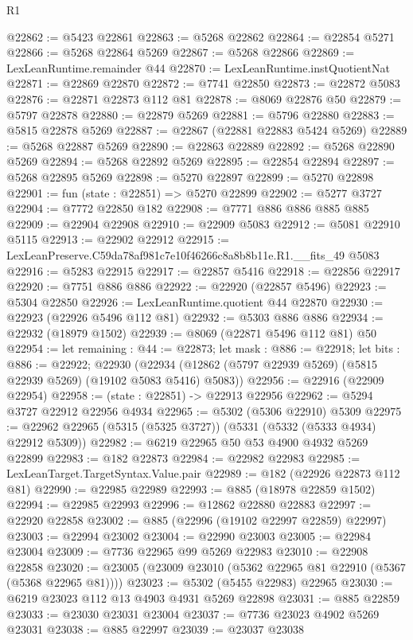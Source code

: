 \begin{lexlean}{R1}
\begin{coremodule}
@22862 := @5423 @22861
@22863 := @5268 @22862
@22864 := @22854 @5271
@22866 := @5268 @22864 @5269
@22867 := @5268 @22866
@22869 := LexLeanRuntime.remainder @44
@22870 := LexLeanRuntime.instQuotientNat
@22871 := @22869 @22870
@22872 := @7741 @22850
@22873 := @22872 @5083
@22876 := @22871 @22873 @112 @81
@22878 := @8069 @22876 @50
@22879 := @5797 @22878
@22880 := @22879 @5269
@22881 := @5796 @22880
@22883 := @5815 @22878 @5269
@22887 := @22867 (@22881 @22883 @5424 @5269)
@22889 := @5268 @22887 @5269
@22890 := @22863 @22889
@22892 := @5268 @22890 @5269
@22894 := @5268 @22892 @5269
@22895 := @22854 @22894
@22897 := @5268 @22895 @5269
@22898 := @5270 @22897
@22899 := @5270 @22898
@22901 := fun (state : @22851) => @5270 @22899
@22902 := @5277 @3727
@22904 := @7772 @22850 @182
@22908 := @7771 @886 @886 @885 @885
@22909 := @22904 @22908
@22910 := @22909 @5083
@22912 := @5081 @22910 @5115
@22913 := @22902 @22912
@22915 := LexLeanPreserve.C59da78af981c7e10f46266c8a8b8b11e.R1.__fits_49 @5083
@22916 := @5283 @22915
@22917 := @22857 @5416
@22918 := @22856 @22917
@22920 := @7751 @886 @886
@22922 := @22920 (@22857 @5496)
@22923 := @5304 @22850
@22926 := LexLeanRuntime.quotient @44 @22870
@22930 := @22923 (@22926 @5496 @112 @81)
@22932 := @5303 @886 @886
@22934 := @22932 (@18979 @1502)
@22939 := @8069 (@22871 @5496 @112 @81) @50
@22954 := let remaining : @44 := @22873;
  let mask : @886 := @22918;
  let bits : @886 := @22922;
  @22930 (@22934 (@12862 (@5797 @22939 @5269) (@5815 @22939 @5269) (@19102 @5083 @5416) @5083))
@22956 := @22916 (@22909 @22954)
@22958 := (state : @22851) -> @22913 @22956
@22962 := @5294 @3727 @22912 @22956 @4934
@22965 := @5302 (@5306 @22910) @5309
@22975 := @22962 @22965 (@5315 (@5325 @3727)) (@5331 (@5332 (@5333 @4934) @22912 @5309))
@22982 := @6219 @22965 @50 @53 @4900 @4932 @5269 @22899
@22983 := @182 @22873
@22984 := @22982 @22983
@22985 := LexLeanTarget.TargetSyntax.Value.pair
@22989 := @182 (@22926 @22873 @112 @81)
@22990 := @22985 @22989
@22993 := @885 (@18978 @22859 @1502)
@22994 := @22985 @22993
@22996 := @12862 @22880 @22883
@22997 := @22920 @22858
@23002 := @885 (@22996 (@19102 @22997 @22859) @22997)
@23003 := @22994 @23002
@23004 := @22990 @23003
@23005 := @22984 @23004
@23009 := @7736 @22965 @99 @5269 @22983
@23010 := @22908 @22858
@23020 := @23005 (@23009 @23010 (@5362 @22965 @81 @22910 (@5367 (@5368 @22965 @81))))
@23023 := @5302 (@5455 @22983) @22965
@23030 := @6219 @23023 @112 @13 @4903 @4931 @5269 @22898
@23031 := @885 @22859
@23033 := @23030 @23031 @23004
@23037 := @7736 @23023 @4902 @5269 @23031
@23038 := @885 @22997
@23039 := @23037 @23038

\end{coremodule}
\end{lexlean}
